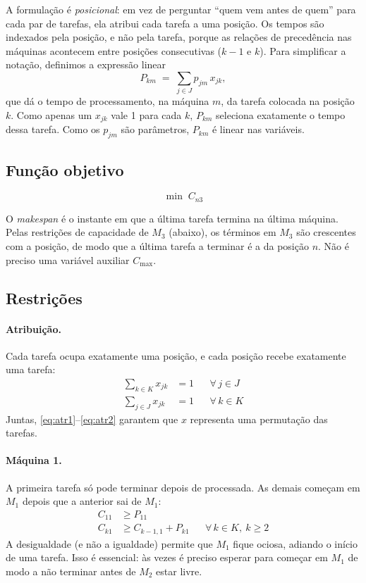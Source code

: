 \documentclass[11pt,a4paper]{article}
\begin{document}
A formulação é \emph{posicional}: em vez de perguntar ``quem vem antes de quem''
para cada par de tarefas, ela atribui cada tarefa a uma posição. Os tempos são
indexados pela posição, e não pela tarefa, porque as relações de precedência
nas máquinas acontecem entre posições consecutivas ($k-1$ e $k$). Para
simplificar a notação, definimos a expressão linear
\[
  P_{km} \;=\; \sum_{j \in J} p_{jm}\, x_{jk},
\]
que dá o tempo de processamento, na máquina $m$, da tarefa colocada na posição
$k$. Como apenas um $x_{jk}$ vale 1 para cada $k$, $P_{km}$ seleciona exatamente
o tempo dessa tarefa. Como os $p_{jm}$ são parâmetros, $P_{km}$ é linear nas
variáveis.

\subsection{Função objetivo}

\begin{equation}
  \min \; C_{n3} \label{eq:obj}
\end{equation}

O \emph{makespan} é o instante em que a última tarefa termina na última
máquina. Pelas restrições de capacidade de $M_3$ (abaixo), os términos em $M_3$
são crescentes com a posição, de modo que a última tarefa a terminar é a da
posição $n$. Não é preciso uma variável auxiliar $C_{\max}$.

\subsection{Restrições}

\paragraph{Atribuição.} Cada tarefa ocupa exatamente uma posição, e cada posição
recebe exatamente uma tarefa:
\begin{align}
  \sum_{k \in K} x_{jk} &= 1 && \forall\, j \in J \label{eq:atr1}\\
  \sum_{j \in J} x_{jk} &= 1 && \forall\, k \in K \label{eq:atr2}
\end{align}
Juntas, \eqref{eq:atr1}--\eqref{eq:atr2} garantem que $x$ representa uma
permutação das tarefas.

\paragraph{Máquina 1.} A primeira tarefa só pode terminar depois de processada.
As demais começam em $M_1$ depois que a anterior sai de $M_1$:
\begin{align}
  C_{11} &\ge P_{11} \label{eq:m1a}\\
  C_{k1} &\ge C_{k-1,1} + P_{k1} && \forall\, k \in K,\ k \ge 2 \label{eq:m1b}
\end{align}
A desigualdade (e não a igualdade) permite que $M_1$ fique ociosa, adiando o
início de uma tarefa. Isso é essencial: às vezes é preciso esperar para começar
em $M_1$ de modo a não terminar antes de $M_2$ estar livre.
\end{document}
